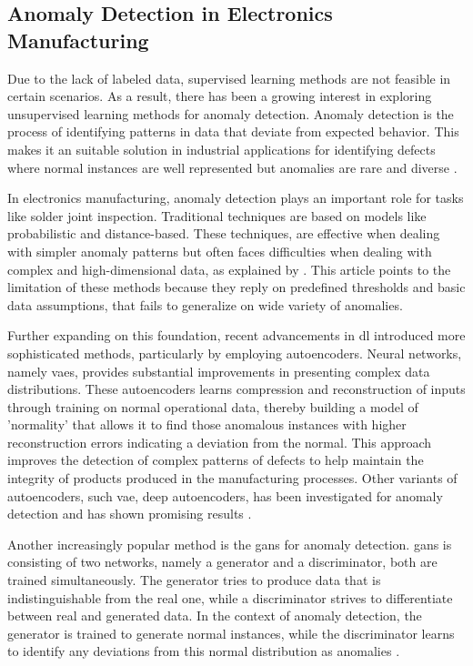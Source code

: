 \subsection{Anomaly Detection in Electronics Manufacturing}

Due to the lack of labeled data, supervised learning methods are not feasible in certain scenarios. As a result, there has been a growing interest in exploring unsupervised learning methods for anomaly detection. Anomaly detection is the process of identifying patterns in data that deviate from expected behavior. This makes it an suitable solution in industrial applications for identifying defects where normal instances are well represented but anomalies are rare and diverse \cite{10.1145/1541880.1541882}.

In electronics manufacturing, anomaly detection plays an important role for tasks like solder joint inspection. Traditional techniques are based on models like probabilistic and distance-based. These techniques, are effective when dealing with simpler anomaly patterns but often faces difficulties when dealing with complex and high-dimensional data, as explained by \cite{PIMENTEL2014215}. This article points to the limitation of these methods because they reply on predefined thresholds and basic data assumptions, that fails to generalize on wide variety of anomalies.

Further expanding on this foundation, recent advancements in \gls{dl} introduced more sophisticated methods, particularly by employing autoencoders\cite{bank2021autoencoders}. Neural networks, namely \glspl{vae}\cite{Kingma_2019}, provides substantial improvements in presenting complex data distributions. These autoencoders learns compression and reconstruction of inputs through training on normal operational data, thereby building a model of 'normality' that allows it to find those anomalous instances with higher reconstruction errors indicating a deviation from the normal\cite{bank2021autoencoders}. This approach improves the detection of complex patterns of defects to help maintain the integrity of products produced in the manufacturing processes. Other variants of autoencoders, such \gls{vae}, deep autoencoders, has been investigated for anomaly detection and has shown promising results \cite{Kingma_2019}.

Another increasingly popular method is the \glspl{gan}\cite{goodfellow2014generativeadversarialnetworks} for anomaly detection. \glspl{gan} is consisting of two networks, namely a generator and a discriminator, both are trained simultaneously. The generator tries to produce data that is indistinguishable from the real one, while a discriminator strives to differentiate between real and generated data. In the context of anomaly detection, the generator is trained to generate normal instances, while the discriminator learns to identify any deviations from this normal distribution as anomalies \cite{schlegl2017unsupervisedanomalydetectiongenerative}.

